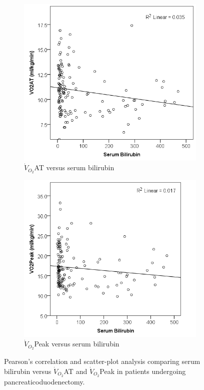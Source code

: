 \begin{figure}[htbp]
	\centering
	\begin{subfigure}{0.48\textwidth}
		\centering
		\includegraphics[width=\textwidth]{Figures/cpet_oj_scatter_at_bil}
		\caption{$\dot{V}_{O_2}$AT versus serum bilirubin}
		\label{fig:cpet_oj_scatter_at_bil}
	\end{subfigure}
	\begin{subfigure}{0.48\textwidth}
		\centering
		\includegraphics[width=\textwidth]{Figures/cpet_oj_scatter_peak_bil}
		\caption{$\dot{V}_{O_2}$Peak versus serum bilirubin}
		\label{fig:cpet_oj_scatter_peak_bil}
	\end{subfigure}
	
	\caption{Pearson's correlation and scatter-plot analysis comparing serum bilirubin versus $\dot{V}_{O_2}$AT and $\dot{V}_{O_2}$Peak in patients undergoing pancreaticoduodenectomy.}
	\label{fig:cpet_oj_scatter}
	
\end{figure}



